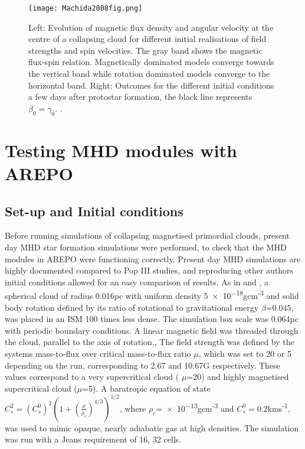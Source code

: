 \documentclass[11pt]{article}
\begin{document}
\begin{figure}[!htb]
         \centering
		\texttt{[image: Machida2008fig.png]}
		\caption{Left: Evolution of magnetic flux density and angular velocity at the centre of a collapsing cloud for different initial realisations of field strengths and spin velocities. The gray band shows the magnetic flux-spin relation. Magnetically dominated models converge towards the vertical band while rotation dominated models converge to the horizontal band. Right: Outcomes for the different initial conditions a few days after protostar formation, the black line represents $\beta_{0}=\gamma_{0}$. \citep{Machida2008a}.}
		\label{fig:Machidafig}
\end{figure}





\section{Testing MHD modules with AREPO}
\label{MHDtest}
\subsection{Set-up and Initial conditions}
\label{sub:ics1}
Before running simulations of collapsing magnetised primordial clouds, present day MHD star formation simulations were performed, to check that the MHD modules in AREPO were functioning correctly. Present day MHD simulations are highly documented compared to Pop III studies, and reproducing other authors  initial conditions allowed for an easy comparison of results. As in \cite{Hennebelle2008} and \cite{Burzle2011}, a spherical cloud of radius 0.016pc with uniform density \num{5e-18}gcm\textsuperscript{-3} and solid body rotation defined by its ratio of rotational to gravitational energy $\beta$=0.045, was placed in an ISM 100 times less dense. The simulation box scale was 0.064pc with periodic boundary conditions. A linear magnetic field was threaded through the cloud, parallel to the axis of rotation., The field strength was defined by the systems mass-to-flux over critical mass-to-flux ratio $\mu$, which was set to 20 or 5 depending on the run, corresponding to 2.67 and 10.67G respectively. These values correspond to a very supercritical cloud ( $\mu$=20) and highly magnetised supercritical cloud ($\mu$=5). A baratropic equation of state $C_{s}^{2}=(C_{s}^{0})^{2}(1+(\frac{\rho}{\rho_{c}})^{4/3})^{1/2}$, where $\rho_{c}$=\num{e-13}gcm\textsuperscript{-3} and $C_{s}^{0}=0.2$kms\textsuperscript{-1}, was used to mimic opaque, nearly adiabatic gas at high densities. The simulation was run with a Jeans requirement of 16, 32 cells.
\end{document}
